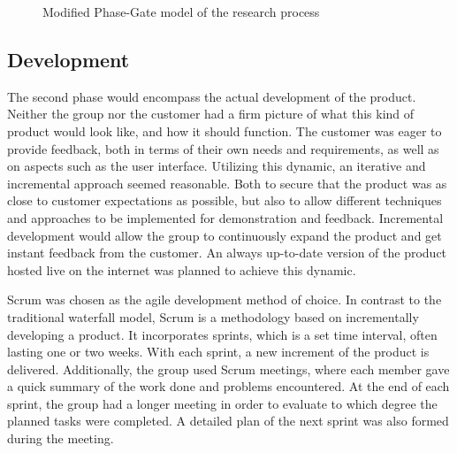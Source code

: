 \begin{center}
  \begin{figure}[ht!]
    \caption{Modified Phase-Gate model of the research process}
    \label{fig:phasegate}
  \end{figure}
\end{center}

\subsection{Development}
\label{subsec:process_and_methodology-process_methodology-development}

The second phase would encompass the actual development of the product. Neither the group nor the customer had a firm picture of what this kind of product would look like, and how it should function. The customer was eager to provide feedback, both in terms of their own needs and requirements, as well as on aspects such as the user interface. Utilizing this dynamic, an iterative and incremental approach seemed reasonable. Both to secure that the product was as close to customer expectations as possible, but also to allow different techniques and approaches to be implemented for demonstration and feedback. Incremental development would allow the group to continuously expand the product and get instant feedback from the customer. An always up-to-date version of the product hosted live on the internet was planned to achieve this dynamic.

Scrum \cite{scrum} was chosen as the agile development method of choice. In contrast to the traditional waterfall model, Scrum is a methodology based on incrementally developing a product. It incorporates sprints, which is a set time interval, often lasting one or two weeks. With each sprint, a new increment of the product is delivered. Additionally, the group used Scrum meetings, where each member gave a quick summary of the work done and problems encountered. At the end of each sprint, the group had a longer meeting in order to evaluate to which degree the planned tasks were completed. A detailed plan of the next sprint was also formed during the meeting.

